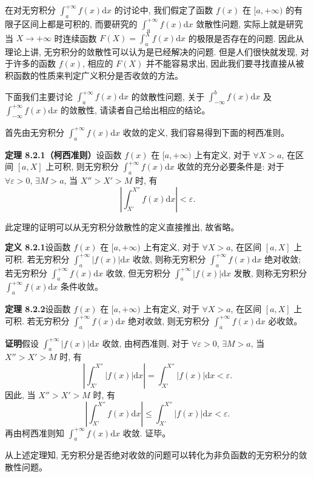 \documentclass[UTF8, 12pt, fontset=fandol, oneside]{ctexart}
\begin{document}
在对无穷积分 $\int_a^{+\infty}f(x)\mathrm dx$ 的讨论中, 我们假定了函数 $f(x)$ 在 $[a,+\infty)$ 的有限子区间上都是可积的, 而要研究的 $\int_a^{+\infty}f(x)\mathrm dx$ 敛散性问题, 实际上就是研究当 $X\to+\infty$ 时连续函数 $F(X)=\int_a^X f(x)\mathrm dx$ 的极限是否存在的问题. 因此从理论上讲, 无穷积分的敛散性可以认为是已经解决的问题. 但是人们很快就发现, 对于许多的函数 $f(x)$, 相应的 $F(X)$ 并不能容易求出, 因此我们要寻找直接从被积函数的性质来判定广义积分是否收敛的方法。

下面我们主要讨论 $\int_a^{+\infty}f(x)\mathrm dx$ 的敛散性问题, 关于 $\int_{-\infty}^b f(x)\mathrm dx$ 及 $\int_{-\infty}^{+\infty}f(x)\mathrm dx$ 的敛散性, 请读者自己给出相应的结论。

首先由无穷积分 $\int_a^{+\infty}f(x)\mathrm dx$ 收敛的定义, 我们容易得到下面的柯西准则。

\noindent\textbf{定理 8.2.1（柯西准则）}\quad 设函数 $f(x)$ 在 $[a,+\infty)$ 上有定义, 对于 $\forall X>a$, 在区间 $[a,X]$ 上可积, 则无穷积分 $\int_a^{+\infty}f(x)\mathrm dx$ 收敛的充分必要条件是: 对于 $\forall\varepsilon>0$, $\exists M>a$, 当 $X''>X'>M$ 时, 有
\[
  \left|\int_{X'}^{X''}f(x)\mathrm dx\right|<\varepsilon.
\]

此定理的证明可以从无穷积分敛散性的定义直接推出, 故省略。

\noindent\textbf{定义 8.2.1}\quad 设函数 $f(x)$ 在 $[a,+\infty)$ 上有定义, 对于 $\forall X>a$, 在区间 $[a,X]$ 上可积. 若无穷积分 $\int_a^{+\infty}|f(x)|\mathrm dx$ 收敛, 则称无穷积分 $\int_a^{+\infty}f(x)\mathrm dx$ 绝对收敛; 若无穷积分 $\int_a^{+\infty}f(x)\mathrm dx$ 收敛, 但无穷积分 $\int_a^{+\infty}|f(x)|\mathrm dx$ 发散, 则称无穷积分 $\int_a^{+\infty}f(x)\mathrm dx$ 条件收敛。

\noindent\textbf{定理 8.2.2}\quad 设函数 $f(x)$ 在 $[a,+\infty)$ 上有定义, 对于 $\forall X>a$, 在区间 $[a,X]$ 上可积. 若无穷积分 $\int_a^{+\infty}f(x)\mathrm dx$ 绝对收敛, 则无穷积分 $\int_a^{+\infty}f(x)\mathrm dx$ 必收敛。

\noindent\textbf{证明}\quad 假设 $\int_a^{+\infty}|f(x)|\mathrm dx$ 收敛, 由柯西准则, 对于 $\forall\varepsilon>0$, $\exists M>a$, 当 $X''>X'>M$ 时, 有
\[
  \left|\int_{X'}^{X''}|f(x)|\mathrm dx\right|
  =
  \int_{X'}^{X''}|f(x)|\mathrm dx<\varepsilon.
\]
因此, 当 $X''>X'>M$ 时, 有
\[
  \left|\int_{X'}^{X''}f(x)\mathrm dx\right|
  \leq
  \int_{X'}^{X''}|f(x)|\mathrm dx<\varepsilon.
\]
再由柯西准则知 $\int_a^{+\infty}f(x)\mathrm dx$ 收敛. 证毕。

从上述定理知, 无穷积分是否绝对收敛的问题可以转化为非负函数的无穷积分的敛散性问题。
\end{document}
